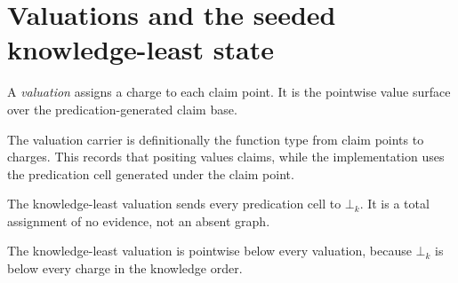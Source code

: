 \section{Valuations and the seeded knowledge-least state}

\begin{proposition}[Valuation]\label{thm:valuation}\leanok{}
A \emph{valuation} assigns a charge to each claim point. It is the pointwise
value surface over the predication-generated claim base.
\end{proposition}

\begin{theorem}\label{thm:valuation-claim-charge}\leanok{}
The valuation carrier is definitionally the function type from claim points to
charges. This records that positing values claims, while the implementation
uses the predication cell generated under the claim point.
\end{theorem}

\begin{proposition}\label{thm:knowledge-least}\leanok{}
The knowledge-least valuation sends every predication cell to $\bot_k$. It is
a total assignment of no evidence, not an absent graph.
\end{proposition}

\begin{theorem}\label{thm:knowledgeLeast-le}\leanok{}
The knowledge-least valuation is pointwise below every valuation, because
$\bot_k$ is below every charge in the knowledge order.
\end{theorem}

